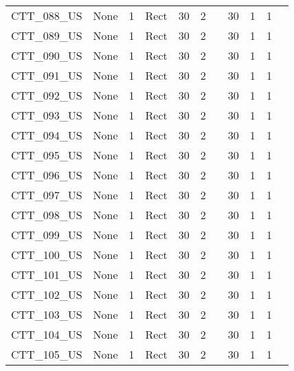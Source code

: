 \begin{table}[]
\begin{tabular}{@{}lcccccccccc@{}}
CTT\_088\_US  & None       & 1        & Rect & 30     & 2     &          & 30     & 1         & 1          \\
CTT\_089\_US  & None       & 1        & Rect & 30     & 2     &          & 30     & 1         & 1          \\
CTT\_090\_US  & None       & 1        & Rect & 30     & 2     &          & 30     & 1         & 1          \\
CTT\_091\_US  & None       & 1        & Rect & 30     & 2     &          & 30     & 1         & 1          \\
CTT\_092\_US  & None       & 1        & Rect & 30     & 2     &          & 30     & 1         & 1          \\
CTT\_093\_US  & None       & 1        & Rect & 30     & 2     &          & 30     & 1         & 1          \\
CTT\_094\_US  & None       & 1        & Rect & 30     & 2     &          & 30     & 1         & 1          \\
CTT\_095\_US  & None       & 1        & Rect & 30     & 2     &          & 30     & 1         & 1          \\
CTT\_096\_US  & None       & 1        & Rect & 30     & 2     &          & 30     & 1         & 1          \\
CTT\_097\_US  & None       & 1        & Rect & 30     & 2     &          & 30     & 1         & 1          \\
CTT\_098\_US  & None       & 1        & Rect & 30     & 2     &          & 30     & 1         & 1          \\
CTT\_099\_US  & None       & 1        & Rect & 30     & 2     &          & 30     & 1         & 1          \\
CTT\_100\_US  & None       & 1        & Rect & 30     & 2     &          & 30     & 1         & 1          \\
CTT\_101\_US  & None       & 1        & Rect & 30     & 2     &          & 30     & 1         & 1          \\
CTT\_102\_US  & None       & 1        & Rect & 30     & 2     &          & 30     & 1         & 1          \\
CTT\_103\_US  & None       & 1        & Rect & 30     & 2     &          & 30     & 1         & 1          \\
CTT\_104\_US  & None       & 1        & Rect & 30     & 2     &          & 30     & 1         & 1          \\
CTT\_105\_US  & None       & 1        & Rect & 30     & 2     &          & 30     & 1         & 1          \\

\end{tabular}
\end{table}
